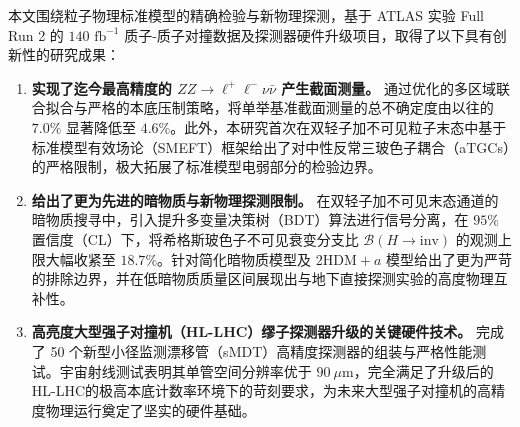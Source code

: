 

\begin{innovations}
本文围绕粒子物理标准模型的精确检验与新物理探测，基于 ATLAS 实验 Full Run 2 的 $140 \text{ fb}^{-1}$ 质子-质子对撞数据及探测器硬件升级项目，取得了以下具有创新性的研究成果：

\begin{enumerate}
    \item \textbf{实现了迄今最高精度的 $ZZ\rightarrow \ell^+\ell^- \nu \bar\nu$ 产生截面测量。} 通过优化的多区域联合拟合与严格的本底压制策略，将单举基准截面测量的总不确定度由以往的 $7.0\%$ 显著降低至 $4.6\%$。此外，本研究首次在双轻子加不可见粒子末态中基于标准模型有效场论（SMEFT）框架给出了对中性反常三玻色子耦合（aTGCs）的严格限制，极大拓展了标准模型电弱部分的检验边界。
    \item \textbf{给出了更为先进的暗物质与新物理探测限制。} 在双轻子加不可见末态通道的暗物质搜寻中，引入提升多变量决策树（BDT）算法进行信号分离，在 $95\%$ 置信度（CL）下，将希格斯玻色子不可见衰变分支比 $\mathcal{B}(H \to \text{inv})$ 的观测上限大幅收紧至 $18.7\%$。针对简化暗物质模型及 $\text{2HDM}+a$ 模型给出了更为严苛的排除边界，并在低暗物质质量区间展现出与地下直接探测实验的高度物理互补性。
    \item \textbf{高亮度大型强子对撞机（HL-LHC）缪子探测器升级的关键硬件技术。} 完成了 50 个新型小径监测漂移管（sMDT）高精度探测器的组装与严格性能测试。宇宙射线测试表明其单管空间分辨率优于 $90 \ \mu\text{m}$，完全满足了升级后的HL-LHC的极高本底计数率环境下的苛刻要求，为未来大型强子对撞机的高精度物理运行奠定了坚实的硬件基础。
\end{enumerate}
\end{innovations}


%
